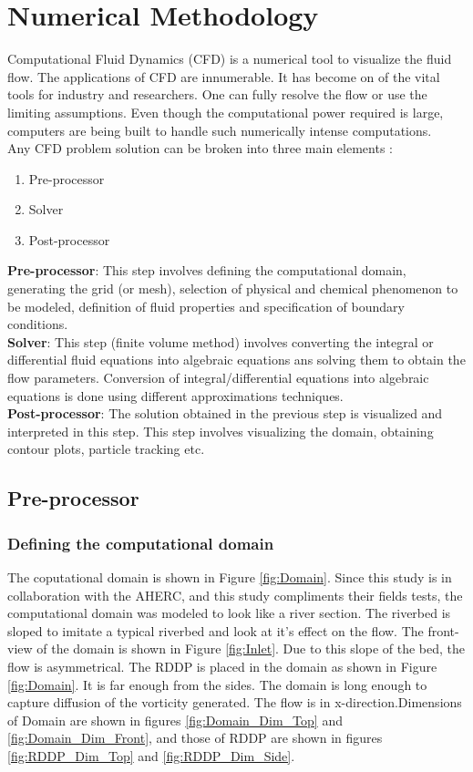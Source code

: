 
\chapter{Numerical Methodology} %

\label{Chapter3} %
Computational Fluid Dynamics (CFD) is a numerical tool to visualize the fluid flow. The applications of CFD are innumerable. It has become on of the vital tools for industry and researchers. One can fully resolve the flow or use the limiting assumptions. Even though the computational power required is large, computers are being built to handle such numerically intense computations.\\
Any CFD problem solution can be broken into three main elements \cite{Reference8}:
\begin{enumerate}
\item Pre-processor
\item Solver
\item Post-processor
\end{enumerate}
\textbf{Pre-processor}: This step involves defining the computational domain, generating the grid (or mesh), selection of physical and chemical phenomenon to be modeled, definition of fluid properties and specification of boundary conditions.\\
\textbf{Solver}: This step (finite volume method) involves converting the integral or differential fluid equations into algebraic equations ans solving them to obtain the flow parameters. Conversion of integral/differential equations into algebraic equations is done using different approximations techniques.\\
\textbf{Post-processor}: The solution obtained in the previous step is visualized and interpreted in this step. This step involves visualizing the domain, obtaining contour plots, particle tracking etc.
\section{Pre-processor}
\subsection*{Defining the computational domain}
The coputational domain is shown in Figure \ref{fig:Domain}. Since this study is in collaboration with the AHERC, and this study compliments their fields tests, the computational domain was modeled to look like a river section. The riverbed is sloped to imitate a typical riverbed and look at it's effect on the flow. The front-view of the domain is shown in Figure \ref{fig:Inlet}. Due to this slope of the bed, the flow is asymmetrical. The RDDP is placed in the domain as shown in Figure \ref{fig:Domain}. It is far enough from the sides. The domain is long enough to capture diffusion of the vorticity generated. The flow is in x-direction.Dimensions of Domain are shown in figures \ref{fig:Domain_Dim_Top} and \ref{fig:Domain_Dim_Front}, and those of RDDP are shown in figures \ref{fig:RDDP_Dim_Top} and \ref{fig:RDDP_Dim_Side}.\\

